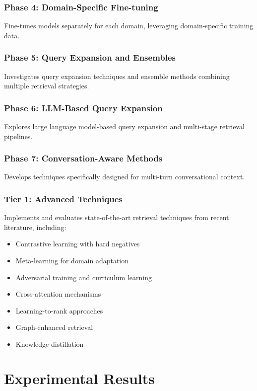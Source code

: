 \documentclass[11pt]{article}
\begin{document}
\subsubsection{Phase 4: Domain-Specific Fine-tuning}
Fine-tunes models separately for each domain, leveraging domain-specific training data.

\subsubsection{Phase 5: Query Expansion and Ensembles}
Investigates query expansion techniques and ensemble methods combining multiple retrieval strategies.

\subsubsection{Phase 6: LLM-Based Query Expansion}
Explores large language model-based query expansion and multi-stage retrieval pipelines.

\subsubsection{Phase 7: Conversation-Aware Methods}
Develops techniques specifically designed for multi-turn conversational context.

\subsubsection{Tier 1: Advanced Techniques}
Implements and evaluates state-of-the-art retrieval techniques from recent literature, including:
\begin{itemize}
    \item Contrastive learning with hard negatives
    \item Meta-learning for domain adaptation
    \item Adversarial training and curriculum learning
    \item Cross-attention mechanisms
    \item Learning-to-rank approaches
    \item Graph-enhanced retrieval
    \item Knowledge distillation
\end{itemize}

\section{Experimental Results}
\end{document}
